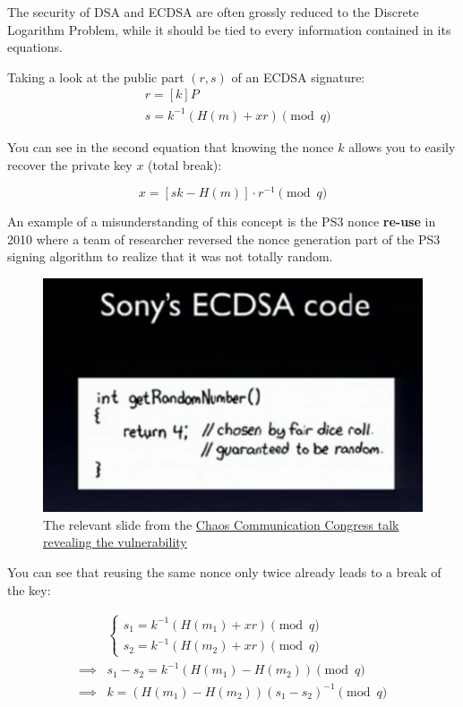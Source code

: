 \documentclass[a4paper,11pt]{article}
\begin{document}
The security of DSA and ECDSA are often grossly reduced to the Discrete Logarithm Problem, while it should be tied to every information contained in its equations.

Taking a look at the public part $(r, s)$ of an ECDSA signature:
\begin{align*}
&r = [k] P\\
&s = k^{-1} ( H(m) + x r ) \pmod{q}
\end{align*}

You can see in the second equation that knowing the nonce $k$ allows you to easily recover the private key $x$ (total break):

$$
x = [ s k - H(m) ] \cdot r^{-1} \pmod{q}
$$

An example of a misunderstanding of this concept is the PS3 nonce \textbf{re-use} in 2010\cite{ps3} where a team of researcher reversed the nonce generation part of the PS3 signing algorithm to realize that it was not totally random.

\begin{figure}[H]
\includegraphics[width=\textwidth]{ps3.png}
\caption{The relevant slide from the \href{https://events.ccc.de/congress/2010/Fahrplan/attachments/1780_27c3_console_hacking_2010.pdf}{Chaos Communication Congress talk revealing the vulnerability}}
\end{figure}

You can see that reusing the same nonce only twice already leads to a break of the key:

\begin{align*}
    &\begin{cases}
    s_1 = k^{-1} ( H(m_1) + x r ) \pmod{q}\\
    s_2 = k^{-1} ( H(m_2) + x r ) \pmod{q}
    \end{cases}\\
\implies& s_1 - s_2 = k^{-1} ( H(m_1) - H(m_2) ) \pmod{q}\\
\implies& k = (H(m_1) - H(m_2)) (s_1 - s_2)^{-1} \pmod{q}
\end{align*}
\end{document}
